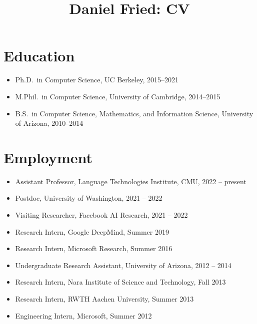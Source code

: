 \documentclass[11pt]{article}
\title{\vspace{-4em}Daniel Fried: CV\vspace{-0.5em}}
\date{}
\begin{document}
\maketitle

\section*{Education}
\begin{itemize}
  \item Ph.D.\ in Computer Science, UC Berkeley, 2015--2021

  \item M.Phil.\ in Computer Science, University of Cambridge, 2014--2015
    

  \item B.S.\ in Computer Science, Mathematics, and Information Science, University of Arizona, 2010--2014
    
\end{itemize}

\section*{Employment}
\begin{itemize}
  \item Assistant Professor, Language Technologies Institute, CMU, 2022 -- present
  \item Postdoc, University of Washington, 2021 -- 2022
  \item Visiting Researcher, Facebook AI Research, 2021 -- 2022
  \item Research Intern, Google DeepMind, Summer 2019
  \item Research Intern, Microsoft Research, Summer 2016
  \item Undergraduate Research Assistant, University of Arizona, 2012 -- 2014
  \item Research Intern, Nara Institute of Science and Technology, Fall 2013
  \item Research Intern, RWTH Aachen University, Summer 2013
  \item Engineering Intern, Microsoft, Summer 2012
\end{itemize}
\end{document}
